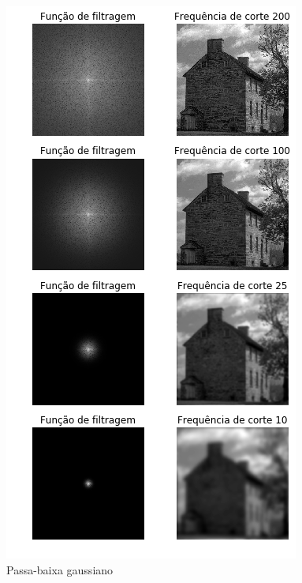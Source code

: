 \documentclass{article}
\begin{document}
\begin{figure}[h!]
    \includegraphics[width=\linewidth]{results/exercicio2passa_baixa.png}
    \caption{Passa-baixa gaussiano}
    \label{fig:exercicio22}
\end{figure}
\end{document}

